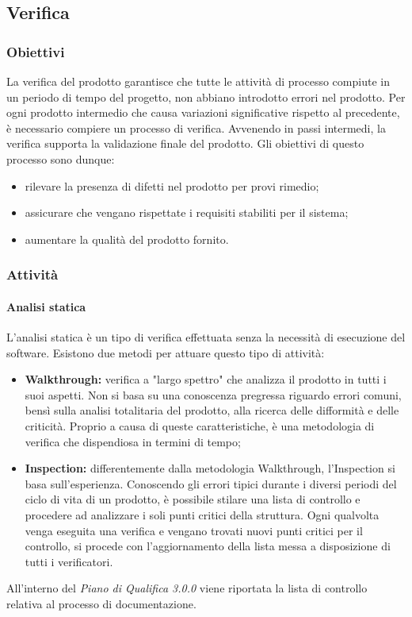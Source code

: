\subsection{Verifica}
\subsubsection{Obiettivi}
La verifica del prodotto garantisce che tutte le attività di processo compiute in un periodo di tempo del progetto, non abbiano introdotto errori nel prodotto. Per ogni prodotto intermedio che causa variazioni significative rispetto al precedente, è necessario compiere un processo di verifica. Avvenendo in passi intermedi, la verifica supporta la validazione finale del prodotto. Gli obiettivi di questo processo sono dunque:
\begin{itemize}
	\item rilevare la presenza di difetti nel prodotto per provi rimedio;
	\item assicurare che vengano rispettate i requisiti stabiliti per il sistema;
	\item aumentare la qualità del prodotto fornito.
\end{itemize}

\subsubsection{Attività}
\paragraph{Analisi statica}
\noindent L'analisi statica è un tipo di verifica effettuata senza la necessità di esecuzione del software. Esistono due metodi per attuare questo tipo di attività:
\begin{itemize}
	\item \textbf{Walkthrough:} verifica a "largo spettro" che analizza il prodotto in tutti i suoi aspetti. Non si basa su una conoscenza pregressa riguardo errori comuni, bensì sulla analisi totalitaria del prodotto, alla ricerca delle difformità e delle criticità. Proprio a causa di queste caratteristiche, è una metodologia di verifica che dispendiosa in termini di tempo;
	\item \textbf{Inspection:} differentemente dalla metodologia Walkthrough, l'Inspection si basa sull'esperienza. Conoscendo gli errori tipici durante i diversi periodi del ciclo di vita di un prodotto, è possibile stilare una lista di controllo e procedere ad analizzare i soli punti critici della struttura. Ogni qualvolta venga eseguita una verifica e vengano trovati nuovi punti critici per il controllo, si procede con l'aggiornamento della lista messa a disposizione di tutti i verificatori.
\end{itemize}
All'interno del \textit{Piano di Qualifica 3.0.0\doc} viene riportata la lista di controllo relativa al processo di documentazione.


